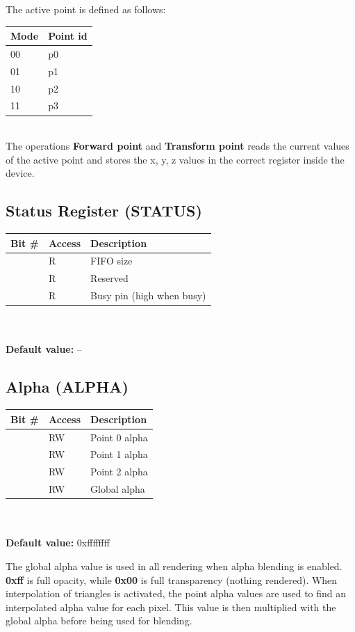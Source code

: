\documentclass[10pt,a4paper]{article}
\begin{document}
The active point is defined as follows:

\begin{tabular}{|l|l|}
\hline \textbf{Mode} & \textbf{Point id}\\ 
\hline
\hline 00 & p0 \\
\hline 01 & p1 \\
\hline 10 & p2 \\
\hline 11 & p3 \\
\hline 
\end{tabular} \\

The operations \textbf{Forward point} and \textbf{Transform point} reads the current values of the active point and stores the x, y, z values in the correct register inside the device.

\subsection{Status Register (STATUS)}
\begin{tabular}{|l|l|l|}
\hline \textbf{Bit \#} & \textbf{Access} & \textbf{Description} \\ 
\hline
\hline [31:16] & R & FIFO size \\
\hline [15:1]  & R & Reserved \\
\hline [0]     & R & Busy pin (high when busy) \\
\hline 
\end{tabular}
\\\\
\textbf{Default value:} --

\subsection{Alpha (ALPHA)}
\begin{tabular}{|l|l|l|}
\hline \textbf{Bit \#} & \textbf{Access} & \textbf{Description} \\ 
\hline
\hline [31:24] & RW & Point 0 alpha \\
\hline [23:16] & RW & Point 1 alpha \\
\hline [15:8] & RW & Point 2 alpha \\
\hline [7:0] & RW & Global alpha \\
\hline 
\end{tabular}
\\\\
\textbf{Default value:} 0xffffffff

The global alpha value is used in all rendering when alpha blending is enabled. \textbf{0xff} is full opacity, while \textbf{0x00} is full transparency (nothing rendered). When interpolation of triangles is activated, the point alpha values are used to find an interpolated alpha value for each pixel. This value is then multiplied with the global alpha before being used for blending.
\end{document}
